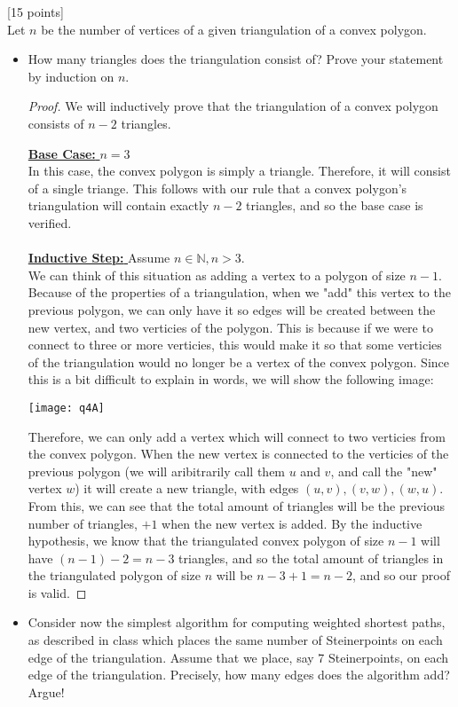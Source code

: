\documentclass[12pt]{article}
\newcommand{\proofheader}[1]{\noindent \underline{#1}}
\newcommand{\base}{\proofheader{\textbf{Base Case:  }}}
\newcommand{\istep}{\proofheader{\textbf{Inductive Step: }}}
\newcounter{ques}
\newenvironment{question}{\stepcounter{ques}{\noindent\bf Question \arabic{ques}:}}{\vspace{5mm}}
\begin{document}
\begin{question}[15 points]\\
Let $n$ be the number of vertices of a given triangulation of a convex polygon.

\begin{itemize}
	\item How many triangles does the triangulation consist of? Prove your statement by induction on $n$.

  \begin{proof}
    We will inductively prove that the triangulation of a convex polygon consists of $n-2$ triangles.

    \base $n=3$\\
    In this case, the convex polygon is simply a triangle. Therefore, it will consist of a single triange. This follows with our rule that a convex polygon's triangulation will contain exactly $n-2$ triangles, and so the base case is verified.\\\\
    \istep Assume $n\in\mathbb{N}, n>3$.\\
    We can think of this situation as adding a vertex to a polygon of size $n-1$.\\
    Because of the properties of a triangulation, when we "add" this vertex to the previous polygon, we can only have it so edges will be created between the new vertex, and two verticies of the polygon. This is because if we were to connect to three or more verticies, this would make it so that some verticies of the triangulation would no longer be a vertex of the convex polygon. Since this is a bit difficult to explain in words, we will show the following image:
    \begin{center}
      \texttt{[image: q4A]}
    \end{center}
    Therefore, we can only add a vertex which will connect to two verticies from the convex polygon. When the new vertex is connected to the verticies of the previous polygon (we will aribitrarily call them $u$ and $v$, and call the "new" vertex $w$) it will create a new triangle, with edges $(u,v), (v,w), (w,u)$.\\
    From this, we can see that the total amount of triangles will be the previous number of triangles, $+1$ when the new vertex is added. By the inductive hypothesis, we know that the triangulated convex polygon of size $n-1$ will have $(n-1)-2=n-3$ triangles, and so the total amount of triangles in the triangulated polygon of size $n$ will be $n-3+1=n-2$, and so our proof is valid.
  \end{proof}


	\item Consider now the simplest algorithm for computing weighted shortest paths, as described in class which places the same number of Steinerpoints on each edge of the triangulation.   Assume that we place, say 7 Steinerpoints,  on each edge of the triangulation. Precisely, how many edges does the algorithm add? Argue!

\end{itemize}


\end{question}
\end{document}
